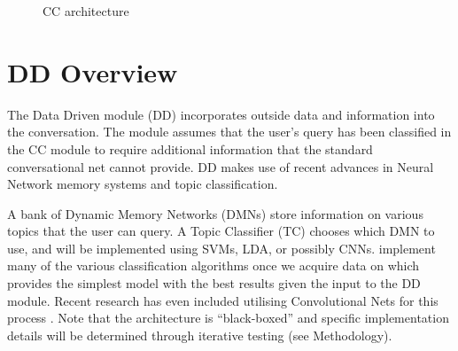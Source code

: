 \documentclass[10pt,twoside,twocolumn]{article}
\begin{document}
\begin{figure}[H]
    \centering
    
    \label{DD_design}
    \caption{CC architecture}
\end{figure}

\section{DD Overview}
The Data Driven module (DD) incorporates outside data and information into the conversation. The module assumes that the user's query has been classified in the CC module to require additional information that the standard conversational net cannot provide. DD makes use of recent advances in Neural Network memory systems and topic classification.

\noindent
A bank of Dynamic Memory Networks (DMNs) \cite{Kumar:2015, Xiong2016} store information on various topics that the user can query. A Topic Classifier (TC) chooses which DMN to use, and will be implemented using SVMs\cite{Joachims1998, Pilaszy2005}, LDA\cite{Blei2001, Zhao2011}, or possibly CNNs\cite{Kim2014}. implement many of the various classification algorithms once we acquire data on which provides the simplest model with the best results given the input to the DD module. Recent research has even included utilising Convolutional Nets for this process \cite{Kim2014}. Note that the architecture is ``black-boxed'' and specific implementation details will be determined through iterative testing (see Methodology).
\end{document}
